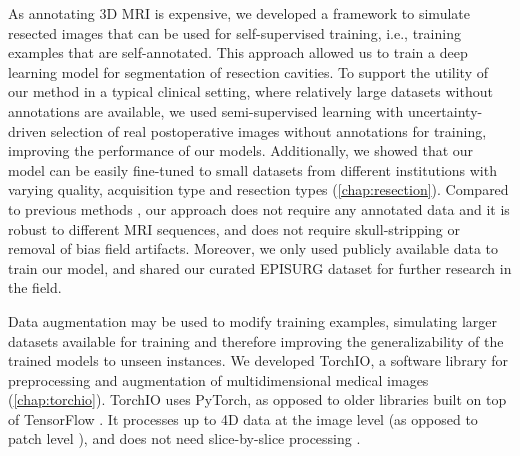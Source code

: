 As annotating 3D \ac{MRI} is expensive, we developed a framework to simulate resected images that can be used for self-supervised training, i.e., training examples that are self-annotated.
This approach allowed us to train a deep learning model for segmentation of resection cavities.
To support the utility of our method in a typical clinical setting, where relatively large datasets without annotations are available, we used semi-supervised learning with uncertainty-driven selection of real postoperative images without annotations for training, improving the performance of our models.
Additionally, we showed that our model can be easily fine-tuned to small datasets from different institutions with varying quality, acquisition type and resection types (\cref{chap:resection}).
Compared to previous methods \cite{ermis_fully_2020,meier_automatic_2017}, our approach does not require any annotated data and it is robust to different \acs{MRI} sequences, and does not require skull-stripping or removal of bias field artifacts.
Moreover, we only used publicly available data to train our model, and shared our curated EPISURG dataset for further research in the field.

Data augmentation may be used to modify training examples, simulating larger datasets available for training and therefore improving the generalizability of the trained models to unseen instances.
We developed TorchIO, a software library for preprocessing and augmentation of multidimensional medical images (\cref{chap:torchio}).
TorchIO uses PyTorch, as opposed to older libraries built on top of TensorFlow \cite{pawlowski_dltk_2017,gibson_niftynet_2018}.
It processes up to 4D data at the image level (as opposed to patch level \cite{isensee_batchgenerators_2020}), and does not need slice-by-slice processing \cite{christian_s_perone_peronemedicaltorch_2018}.
